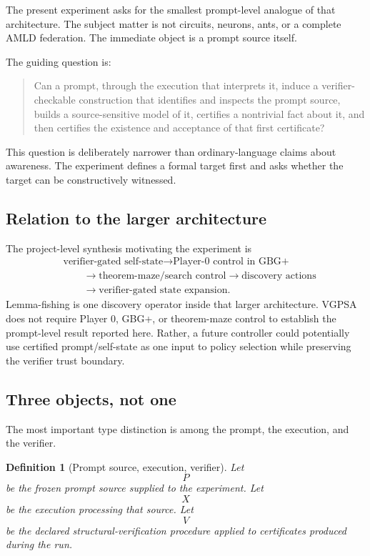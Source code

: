 \documentclass[11pt]{article}
\newtheorem{definition}{Definition}[section]
\theoremstyle{remark}
\begin{document}
The present experiment asks for the smallest prompt-level analogue of that architecture. The subject matter is not circuits, neurons, ants, or a complete AMLD federation. The immediate object is a prompt source itself.

The guiding question is:
\begin{quote}
Can a prompt, through the execution that interprets it, induce a verifier-checkable construction that identifies and inspects the prompt source, builds a source-sensitive model of it, certifies a nontrivial fact about it, and then certifies the existence and acceptance of that first certificate?
\end{quote}

This question is deliberately narrower than ordinary-language claims about awareness. The experiment defines a formal target first and asks whether the target can be constructively witnessed.

\subsection{Relation to the larger architecture}

The project-level synthesis motivating the experiment is
\[
\begin{aligned}
&\text{verifier-gated self-state}
\longrightarrow \text{Player-0 control in GBG+}\\
&\qquad\longrightarrow \text{theorem-maze/search control}
\longrightarrow \text{discovery actions}\\
&\qquad\longrightarrow \text{verifier-gated state expansion}.
\end{aligned}
\]
Lemma-fishing is one discovery operator inside that larger architecture. VGPSA does not require Player 0, GBG+, or theorem-maze control to establish the prompt-level result reported here. Rather, a future controller could potentially use certified prompt/self-state as one input to policy selection while preserving the verifier trust boundary.

\subsection{Three objects, not one}

The most important type distinction is among the prompt, the execution, and the verifier.

\begin{definition}[Prompt source, execution, verifier]
Let
\[
P
\]
be the frozen prompt source supplied to the experiment. Let
\[
X
\]
be the execution processing that source. Let
\[
V
\]
be the declared structural-verification procedure applied to certificates produced during the run.
\end{definition}
\end{document}
